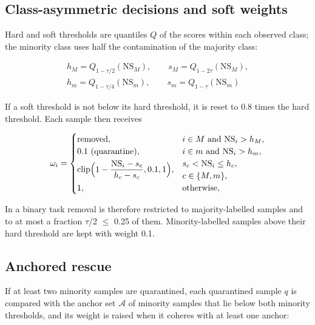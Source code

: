 \documentclass[conference]{IEEEtran}
\begin{document}
\subsection{Class-asymmetric decisions and soft weights}\label{sec:class-asymmetric-decisions-and-soft-weights}

Hard and soft thresholds are quantiles $Q$ of the scores within each observed class; the minority class uses half the contamination of the majority class:

\begin{equation}
\begin{gathered}
h_M=Q_{1-\tau/2}(\mathrm{NS}_M),\qquad s_M=Q_{1-2\tau}(\mathrm{NS}_M),\\
h_m=Q_{1-\tau/4}(\mathrm{NS}_m),\qquad s_m=Q_{1-\tau}(\mathrm{NS}_m)
\end{gathered}
\label{eq:9}
\end{equation}

If a soft threshold is not below its hard threshold, it is reset to 0.8 times the hard threshold. Each sample then receives

\begin{equation}
\omega_i=\begin{cases}
\text{removed}, & i\in M \text{ and } \mathrm{NS}_i>h_M,\\
0.1\ (\text{quarantine}), & i\in m \text{ and } \mathrm{NS}_i>h_m,\\
\operatorname{clip}\Bigl(1-\dfrac{\mathrm{NS}_i-s_c}{h_c-s_c},0.1,1\Bigr), & \begin{array}{@{}l@{}}s_c<\mathrm{NS}_i\le h_c,\\ c\in\{M,m\},\end{array}\\
1, & \text{otherwise},
\end{cases}
\label{eq:10}
\end{equation}

In a binary task removal is therefore restricted to majority-labelled samples and to at most a fraction $\tau $/2 $\le $ 0.25 of them. Minority-labelled samples above their hard threshold are kept with weight 0.1.

\subsection{Anchored rescue}\label{sec:anchored-rescue}

If at least two minority samples are quarantined, each quarantined sample $q$ is compared with the anchor set $\mathcal{A}$ of minority samples that lie below both minority thresholds, and its weight is raised when it coheres with at least one anchor:
\end{document}
